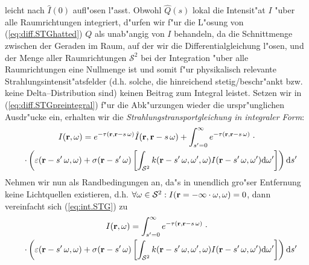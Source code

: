 \documentclass[11pt,a4paper,DIVcalc,BCOR8mm,titlepage,twoside]{scrartcl}
\begin{document}
	leicht nach ${\hat I}(0)$ aufl"osen l"asst. Obwohl ${\hat Q}(s)$ lokal die Intensit"at $I$ "uber alle Raumrichtungen integriert, d"urfen wir f"ur die L"osung von (\ref{eq:diff.STGhatted}) $Q$ als unab"angig von $I$ behandeln, da die Schnittmenge zwischen der Geraden im Raum, auf der wir die Differentialgleichung l"osen, und der Menge aller Raumrichtungen $\mathcal{S}^2$ bei der Integration "uber alle Raumrichtungen eine Nullmenge ist und somit f"ur physikalisch relevante Strahlungsintensit"atsfelder (d.h. solche, die hinreichend stetig/beschr"ankt bzw. keine Delta--Distribution sind) keinen Beitrag zum Integral leistet.
	Setzen wir in (\ref{eq:diff.STGpreintegral}) f"ur die Abk"urzungen wieder die urspr"unglichen Ausdr"ucke ein, erhalten wir die {\em Strahlungstransportgleichung in integraler Form}:
	\begin{multline}
		I(\mathbf{r},\omega) = e^{-\tau(\mathbf{r},\mathbf{r}-s\,\omega)} {\hat I}(\mathbf{r},\mathbf{r}-s\,\omega) + \int_{s'=0}^\infty e^{-\tau(\mathbf{r},\mathbf{r}-s\,\omega)} \;\cdot \\
		\quad\cdot\left( \varepsilon(\mathbf{r}-s'\,\omega,\omega) + \sigma(\mathbf{r}-s'\,\omega)
		\left[ \int_{\mathcal{S}^2} k(\mathbf{r}-s'\,\omega,\omega',\omega)I(\mathbf{r}-s'\,\omega,\omega') \text{d}\omega'\right] \right) \text{d}s'
		\label{eq:int.STG}
	\end{multline}
	Nehmen wir nun als Randbedingungen an, da"s in unendlich gro"ser Entfernung keine Lichtquellen existieren, d.h. $\forall \omega \in \mathcal{S}^2 : I(\mathbf{r}=-\infty\cdot\omega,\omega)=0$, dann vereinfacht sich (\ref{eq:int.STG}) zu
	\begin{multline}
		I(\mathbf{r},\omega) = \int_{s'=0}^\infty e^{-\tau(\mathbf{r},\mathbf{r}-s\,\omega)} \;\cdot \\
		\quad\cdot\left( \varepsilon(\mathbf{r}-s'\,\omega,\omega) + \sigma(\mathbf{r}-s'\,\omega)
		\left[ \int_{\mathcal{S}^2} k(\mathbf{r}-s'\,\omega,\omega',\omega)I(\mathbf{r}-s'\,\omega,\omega') \text{d}\omega'\right] \right) \text{d}s'
		\label{eq:int.STGdarkbg}
	\end{multline}
\end{document}
